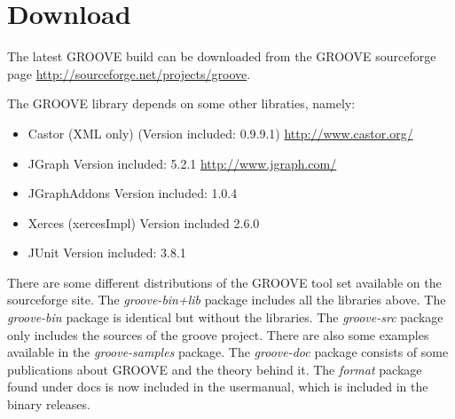\section{Download}

The latest GROOVE build can be downloaded from the GROOVE sourceforge page \url{http://sourceforge.net/projects/groove}.

The GROOVE library depends on some other libraties, namely:

\begin{itemize}
\item Castor (XML only) (Version included: 0.9.9.1) \url{http://www.castor.org/}
\item JGraph Version included: 5.2.1 \url{http://www.jgraph.com/}
\item JGraphAddons Version included: 1.0.4
\item Xerces (xercesImpl) Version included 2.6.0
\item JUnit Version included: 3.8.1
\end{itemize}

There are some different distributions of the GROOVE tool set available on the sourceforge site. The \emph{groove-bin+lib} package includes all the libraries above. The \emph{groove-bin} package is identical but without the libraries. The \emph{groove-src} package only includes the sources of the groove project. There are also some examples available in the \emph{groove-samples} package. The \emph{groove-doc} package consists of some publications about GROOVE and the theory behind it. The \emph{format} package found under docs is now included in the usermanual, which is included in the binary releases.
